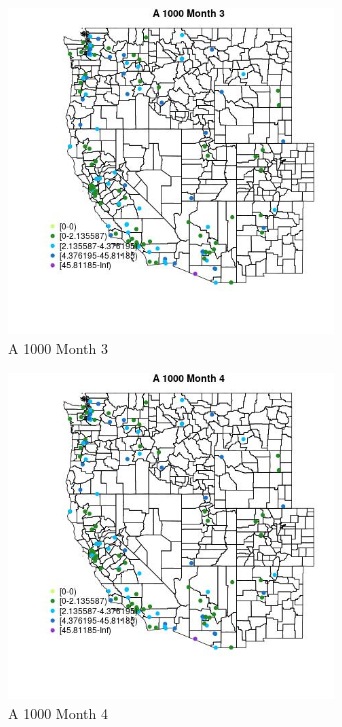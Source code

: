 \begin{figure} 
\centering  
\includegraphics[width=0.77\textwidth]{Code_Outputs/Report_ML_input_PM25_Step4_part_e_de_duplicated_aves_MapObsMo3A_1000.jpg} 
\caption{\label{fig:Report_ML_input_PM25_Step4_part_e_de_duplicated_avesMapObsMo3A_1000}A 1000 Month 3} 
\end{figure} 
 

\begin{figure} 
\centering  
\includegraphics[width=0.77\textwidth]{Code_Outputs/Report_ML_input_PM25_Step4_part_e_de_duplicated_aves_MapObsMo4A_1000.jpg} 
\caption{\label{fig:Report_ML_input_PM25_Step4_part_e_de_duplicated_avesMapObsMo4A_1000}A 1000 Month 4} 
\end{figure} 
 

